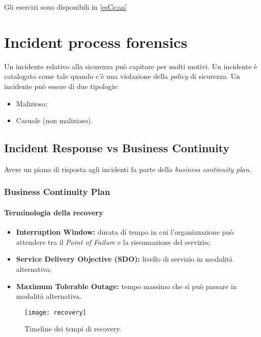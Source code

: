 Gli esercizi sono disponibili in \ref{esCs:aa}

\part{Incident process forensics}

Un incidente relativo alla sicurezza può capitare per molti motivi. Un
incidente è catalogato come tale quando c'è una violazione della 
\textit{policy} di sicurezza. Un incidente può essere di due tipologie:
\begin{itemize}
\item Malizioso;
\item Casuale (non malizioso).
\end{itemize}

\chapter{Incident Response vs Business Continuity}
\label{IRBC}

Avere un piano di risposta agli incidenti fa parte della \textit{business
continuity plan}.

\section{Business Continuity Plan}

\subsection{Terminologia della recovery}

\begin{itemize}
\item \textbf{Interruption Window:} durata di tempo in cui l'organizzazione 
può attendere tra il \textit{Point of Failure} e la riesumazione del servizio;
\item \textbf{Service Delivery Objective (SDO):} livello di servizio in 
modalità alternativa;
\item \textbf{Maximum Tolerable Outage:} tempo massimo che si può passare in 
modalità alternativa.
\end{itemize}

\begin{figure}[h!]
        \begin{center}
                \texttt{[image: recovery]}
        \end{center}
        \caption{Timeline dei tempi di recovery.}
        \label{fig:audit:hooks}
\end{figure}

